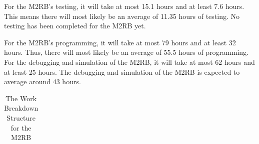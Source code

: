 \documentclass[crop=false]{standalone}
\begin{document}
        For the M2RB's testing, it will take at most 15.1 hours and at least 7.6 hours. This means there will most likely be an average of 11.35 hours of testing. No testing has been completed for the M2RB yet.

        For the M2RB's programming, it will take at most 79 hours and at least 32 hours. Thus, there will most likely be an average of 55.5 hours of programming. For the debugging and simulation of the M2RB, it will take at most 62 hours and at least 25 hours. The debugging and simulation of the M2RB is expected to average around 43 hours.
            
        
        \begin{landscape}
            \begin{longtable}[c]{|c|m{2cm}|c|m{4cm}|m{2cm}|m{2cm}|m{2cm}|}
            \caption{The Work Breakdown Structure for the M2RB}
            \label{table:M2RBWBS} \\
            

\end{longtable}
\end{landscape}
\end{document}
